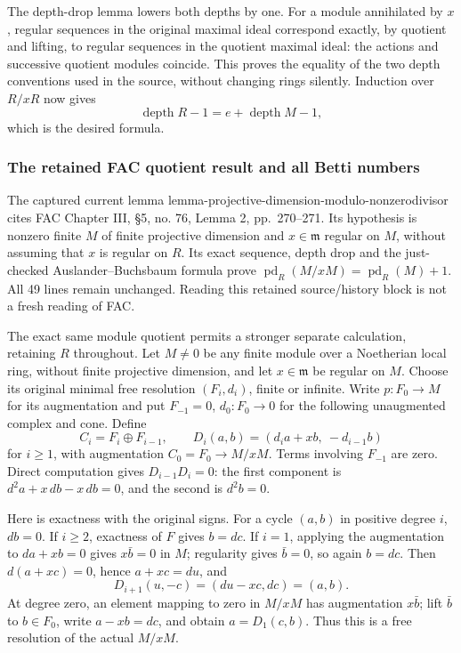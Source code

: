 The depth-drop lemma lowers both depths by one. For a module annihilated by \(x\), regular sequences in the original maximal ideal correspond exactly, by quotient and lifting, to regular sequences in the quotient maximal ideal: the actions and successive quotient modules coincide. This proves the equality of the two depth conventions used in the source, without changing rings silently. Induction over \(R/xR\) now gives \[
\operatorname{depth}R-1=e+\operatorname{depth}M-1,
\] which is the desired formula.

\subsubsection{The retained FAC quotient result and all Betti numbers}\label{the-retained-fac-quotient-result-and-all-betti-numbers}

The captured current lemma lemma-projective-dimension-modulo-nonzerodivisor cites FAC Chapter III, §5, no. 76, Lemma 2, pp.~270--271. Its hypothesis is nonzero finite \(M\) of finite projective dimension and \(x\in\mathfrak m\) regular on \(M\), without assuming that \(x\) is regular on \(R\). Its exact sequence, depth drop and the just-checked Auslander--Buchsbaum formula prove \(\operatorname{pd}_R(M/xM)=\operatorname{pd}_R(M)+1\). All 49 lines remain unchanged. Reading this retained source/history block is not a fresh reading of FAC.

The exact same module quotient permits a stronger separate calculation, retaining \(R\) throughout. Let \(M\ne0\) be any finite module over a Noetherian local ring, without finite projective dimension, and let \(x\in\mathfrak m\) be regular on \(M\). Choose its original minimal free resolution \((F_i,d_i)\), finite or infinite. Write \(p:F_0\to M\) for its augmentation and put \(F_{-1}=0\), \(d_0:F_0\to0\) for the following unaugmented complex and cone. Define \[
C_i=F_i\oplus F_{i-1},\qquad
D_i(a,b)=(d_i a+x b,\ -d_{i-1}b)
\] for \(i\ge1\), with augmentation \(C_0=F_0\to M/xM\). Terms involving \(F_{-1}\) are zero. Direct computation gives \(D_{i-1}D_i=0\): the first component is \(d^2a+x\,db-x\,db=0\), and the second is \(d^2b=0\).

Here is exactness with the original signs. For a cycle \((a,b)\) in positive degree \(i\), \(db=0\). If \(i\ge2\), exactness of \(F\) gives \(b=dc\). If \(i=1\), applying the augmentation to \(da+xb=0\) gives \(x\bar b=0\) in \(M\); regularity gives \(\bar b=0\), so again \(b=dc\). Then \(d(a+xc)=0\), hence \(a+xc=du\), and \[
D_{i+1}(u,-c)=(du-xc,dc)=(a,b).
\] At degree zero, an element mapping to zero in \(M/xM\) has augmentation \(x\bar b\); lift \(\bar b\) to \(b\in F_0\), write \(a-xb=dc\), and obtain \(a=D_1(c,b)\). Thus this is a free resolution of the actual \(M/xM\).

